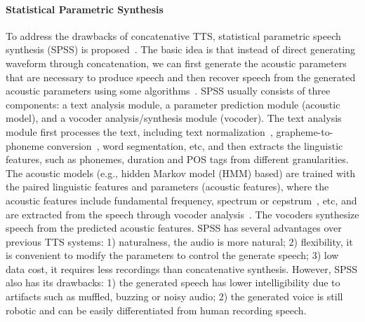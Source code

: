 \documentclass{article}
\begin{document}
\paragraph{Statistical Parametric Synthesis}
To address the drawbacks of concatenative TTS, statistical parametric speech synthesis (SPSS) is proposed~\cite{yoshimura1999simultaneous,tokuda2000speech,yoshimura2002simultaneous,zen2009statistical,tokuda2013speech}. The basic idea is that instead of direct generating waveform through concatenation, we can first generate the acoustic parameters~\cite{fukada1992adaptive,tokuda1994mel,kawahara1999restructuring} that are necessary to produce speech and then recover speech from the generated acoustic parameters using some algorithms~\cite{imai1983mel,imai1983cepstral,kawahara2006straight,morise2016world}. SPSS usually consists of three components: a text analysis module, a parameter prediction module (acoustic model), and a vocoder analysis/synthesis module (vocoder). The text analysis module first processes the text, including text normalization~\cite{sproat2001normalization}, grapheme-to-phoneme conversion~\cite{bisani2008joint}, word segmentation, etc, and then extracts the linguistic features, such as phonemes, duration and POS tags from different granularities. The acoustic models (e.g., hidden Markov model (HMM) based) are trained with the paired linguistic features and parameters (acoustic features), where the acoustic features include fundamental frequency, spectrum or cepstrum~\cite{fukada1992adaptive,tokuda1994mel}, etc, and are extracted from the speech through vocoder analysis~\cite{imai1983mel,kawahara2006straight,morise2016world}. The vocoders synthesize speech from the predicted acoustic features. SPSS has several advantages over previous TTS systems: 1) naturalness, the audio is more natural; 2) flexibility, it is convenient to modify the parameters to control the generate speech; 3) low data cost, it requires less recordings than concatenative synthesis. However, SPSS also has its drawbacks: 1) the generated speech has lower intelligibility due to artifacts such as muffled, buzzing or noisy audio; 2) the generated voice is still robotic and can be easily differentiated from human recording speech.
\end{document}
